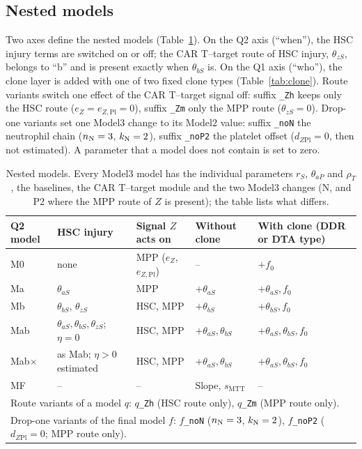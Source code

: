 \documentclass[11pt]{article}
\begin{document}
\subsection{Nested models}\label{sec:nested}
Two axes define the nested models (Table~\ref{tab:models}). On the Q2 axis (``when''), the HSC injury terms are switched on or off; the CAR T--target route of HSC injury, $\theta_{zS}$, belongs to ``b'' and is present exactly when $\theta_{bS}$ is. On the Q1 axis (``who''), the clone layer is added with one of two fixed clone types (Table~\ref{tab:clone}). Route variants switch one effect of the CAR T--target signal off: suffix \texttt{\_Zh} keeps only the HSC route ($e_Z=e_{Z,\mathrm{Pl}}=0$), suffix \texttt{\_Zm} only the MPP route ($\theta_{zS}=0$). Drop-one variants set one Model3 change to its Model2 value: suffix \texttt{\_noN} the neutrophil chain ($n_{\mathrm{N}}=3$, $k_{\mathrm{N}}=2$), suffix \texttt{\_noP2} the platelet offset ($d_{Z\mathrm{Pl}}=0$, then not estimated). A parameter that a model does not contain is set to zero.

\begin{table}[!htbp]
\centering\footnotesize
\setlength{\tabcolsep}{4pt}
\caption{Nested models. Every Model3 model has the individual parameters $r_S$, $\theta_{aP}$ and $\rho_T$, the baselines, the CAR T--target module and the two Model3 changes (N, and P2 where the MPP route of $Z$ is present); the table lists what differs.}\label{tab:models}
\begin{tabular}{lllll}
\toprule
Q2 model & HSC injury & Signal $Z$ acts on & Without clone & With clone (DDR or DTA type)\\
\midrule
M0 & none & MPP ($e_Z$, $e_{Z,\mathrm{Pl}}$) & -- & $+f_0$\\
Ma & $\theta_{aS}$ & MPP & $+\theta_{aS}$ & $+\theta_{aS},f_0$\\
Mb & $\theta_{bS}$, $\theta_{zS}$ & HSC, MPP & $+\theta_{bS}$ & $+\theta_{bS},f_0$\\
Mab & $\theta_{aS},\theta_{bS},\theta_{zS}$; $\eta=0$ & HSC, MPP & $+\theta_{aS},\theta_{bS}$ & $+\theta_{aS},\theta_{bS},f_0$\\
Mab$\times$ & as Mab; $\eta>0$ estimated & HSC, MPP & $+\theta_{aS},\theta_{bS}$ & $+\theta_{aS},\theta_{bS},f_0$\\
MF & -- & -- & Slope, $s_{\mathrm{MTT}}$ & --\\
\midrule
\multicolumn{5}{l}{Route variants of a model $q$: $q$\texttt{\_Zh} (HSC route only), $q$\texttt{\_Zm} (MPP route only).}\\
\multicolumn{5}{l}{Drop-one variants of the final model $f$: $f$\texttt{\_noN} ($n_{\mathrm{N}}=3$, $k_{\mathrm{N}}=2$), $f$\texttt{\_noP2} ($d_{Z\mathrm{Pl}}=0$; MPP route only).}\\
\bottomrule
\end{tabular}
\end{table}
\end{document}
